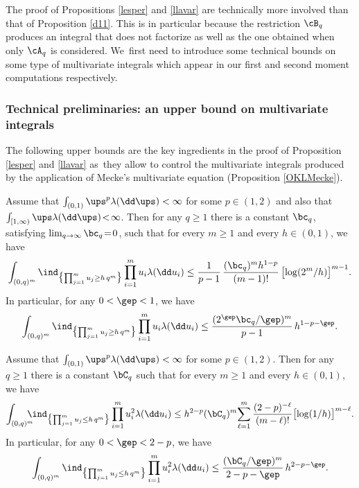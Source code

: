 The proof of Propositions \ref{lesper} and \ref{llavar} are technically more involved than that of Proposition \ref{d11}. This is in particular because the restriction $\cB_q$ produces an integral that does not factorize as well as the one obtained when only $\cA_q$ is considered. We~first need to introduce some technical bounds on some type of multivariate integrals which appear in our first and second moment computations respectively.

\subsubsection{Technical preliminaries: an upper bound on multivariate integrals}

The following upper bounds are the key ingredients in the proof of Proposition \ref{lesper} and \ref{llavar} as~they allow to control the multivariate integrals produced by the application of Mecke's multivariate equation (Proposition \ref{OKLMecke}).

\begin{lemma}
\label{lem:tailzzz1}
Assume that $\int_{(0,1)} \ups^p \lambda(\dd \ups) <\infty$
for some $p \in (1,2)$ and also that $\int_{[1,\infty)} \ups \lambda(\dd \ups)\!<\!\infty$. Then for any $q\!\geq\!1$ there is
a constant $\bc_q$, satisfying $\lim_{q\to\infty} \bc_q\!=\!0$,
such that for every $m\geq 1$ and every $h\in (0,1)$, we have
\begin{equation}
\label{firstline1}
\int_{(0,q)^m} \ind_{\bigl\{\prod^m_{j=1}u_j \ge h\, q^m\bigr\}} \prod_{i=1}^m u_i \lambda(\dd u_i) \le \frac{1}{p-1}\,
\frac{ (\bc_q)^m h^{1-p} }{(m-1)!}\, \bigl[ \log (2^m/h)\bigr]^{m-1}.
\end{equation}
In particular, for any $0< \gep < 1$, we have
\begin{equation}
\label{secondline}
\int_{(0,q)^m} \ind_{\bigl\{\prod^m_{j=1}u_j \ge h \, q^m\bigr\}} \prod_{i=1}^m u_i \lambda(\dd u_i) \le \frac{ (2^{\gep}\bc_q /\gep)^{m} }{p-1} \, h^{1-p-\gep}.
\end{equation}
\end{lemma}

\begin{lemma}
\label{lem:tailzzz2}
Assume that $\int_{(0,1)} \ups^p \lambda(\dd \ups) <\infty$
for some $p \in (1,2)$. Then for any $q\geq 1$ there is
a constant $\bC_q$
such that for every $m\geq 1$ and every $h\in (0,1)$, we have
\begin{equation}
\label{firstline2}
\int_{(0,q)^m} \hspace*{-3mm}\ind_{\bigl\{\prod^m_{j=1}u_j \le h\, q^m\bigr\}} \prod_{i=1}^m u_i^2 \lambda(\dd u_i) \le
h^{2-p}  (\bC_q)^{m}\!\sum_{\ell=1}^{m}\frac{(2-p)^{-\ell}}{(m-\ell)!} \bigl[\log (1/h)\bigr]^{m-\ell}.
\end{equation}
In particular, for any $0< \gep < 2-p$, we have
\begin{equation}
\label{thirdline}
\int_{(0,q)^m} \ind_{\bigl\{\prod^m_{j=1}u_j \le h\, q^m\bigr\}} \prod_{i=1}^m u^2_i \lambda(\dd u_i) \le \frac{ (\bC_q/\gep)^m }{2- p-\gep} \, h^{2-p-\gep}.
\end{equation}
\end{lemma}

